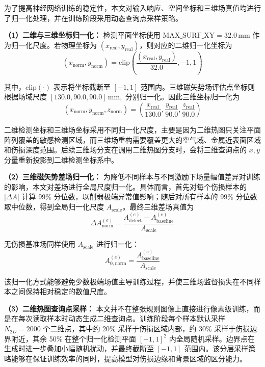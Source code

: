 为了提高神经网络训练的稳定性，本文对输入响应、空间坐标和三维场真值均进行了归一化处理，并在训练阶段采用动态查询点采样策略。

\textbf{（1）二维与三维坐标归一化：}
检测平面坐标使用
$
\mathrm{MAX\_SURF\_XY}=32.0\,\mathrm{mm}
$
作为归一化尺度。若物理坐标为 $(x_{\mathrm{real}},y_{\mathrm{real}})$，则对应的二维归一化坐标为
\begin{equation}
\label{eq:xy_norm}
(x_{\mathrm{norm}},y_{\mathrm{norm}})
=
\mathrm{clip}
\left(
\frac{(x_{\mathrm{real}},y_{\mathrm{real}})}{32.0},
-1,1
\right)
\end{equation}

其中，$\mathrm{clip}(\cdot)$ 表示将坐标截断至 $[-1,1]$ 范围内。三维磁矢势场评估点坐标则根据场域尺度
$
[130.0,90.0,90.0]\,\mathrm{mm},
$
分别归一化。因此三维坐标归一化为
\begin{equation}
\label{eq:xyz_norm}
(x_{\mathrm{norm}},y_{\mathrm{norm}},z_{\mathrm{norm}})
=
\left(
\frac{x_{\mathrm{real}}}{130.0},
\frac{y_{\mathrm{real}}}{90.0},
\frac{z_{\mathrm{real}}}{90.0}
\right)
\end{equation}

二维检测坐标和三维场坐标采用不同归一化尺度，主要是因为二维热图只关注平面阵列覆盖的敏感检测区域，而三维场重构需要覆盖更大的空气域、金属近表面区域和伤损深度范围。后续三维场分支在调用二维热图分支时，会将三维查询点的 $x,y$ 分量重新投影到二维检测坐标系中。

\textbf{（2）三维磁矢势差场归一化：}
为降低不同样本与不同激励下场量幅值差异对训练的影响，本文对差场进行全局尺度归一化。具体而言，首先对每个伤损样本的 $|\Delta A|$ 计算 99\% 分位数，以削弱极端异常值影响；随后对所有样本的 99\% 分位数取中位数，得到全局归一化尺度 $A_{\mathrm{scale}}$。最终三维差场真值为
\begin{equation}
\label{eq:delta_A_norm}
\Delta A_{\mathrm{norm}}^{(e)}
=
\frac{
A_{\mathrm{defect}}^{(e)}
-
A_{\mathrm{baseline}}^{(e)}
}
{A_{\mathrm{scale}}}
\end{equation}

无伤损基准场同样使用 $A_{\mathrm{scale}}$ 进行归一化：
\begin{equation}
\label{eq:A0_norm}
A_{0,\mathrm{norm}}^{(e)}
=
\frac{
A_{\mathrm{baseline}}^{(e)}
}
{A_{\mathrm{scale}}}
\end{equation}

该归一化方式能够避免少数极端场值主导训练过程，并使三维场监督损失在不同样本之间保持相对稳定的数值尺度。

\textbf{（3）二维热图查询点采样：}
本文并不在整张规则图像上直接进行像素级训练，而是在每次读取样本时动态生成二维查询点。训练阶段每个样本默认采样 $N_{2D}=2000$ 个二维点，其中约 20\% 采样于伤损区域内部，约 30\% 采样于伤损边界附近，其余 50\% 在整个归一化检测平面 $[-1,1]^2$ 内全局随机采样。边界点在生成时进一步叠加小幅随机扰动，并最终截断至 $[-1,1]$ 范围内。该分层采样策略能够在保证训练效率的同时，提高模型对伤损边缘和背景区域的区分能力。

